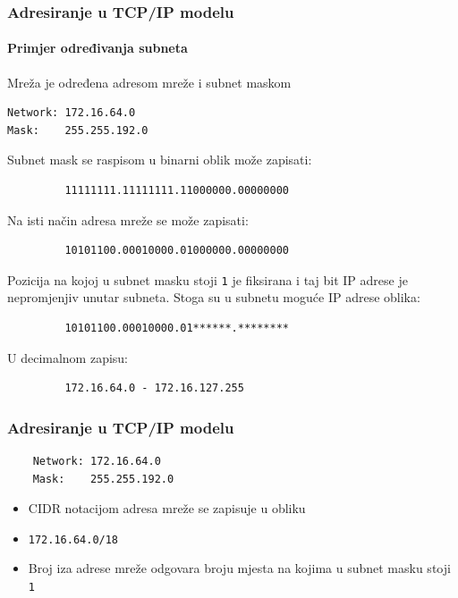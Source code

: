 \documentclass[t,table,usenames,dvipsnames]{beamer}
\begin{document}
\begin{frame}[fragile]
	\frametitle{Adresiranje u TCP/IP modelu}
	\framesubtitle{Primjer određivanja subneta}
	\footnotesize
	Mreža je određena adresom mreže i subnet maskom
	\begin{verbatim}
Network: 172.16.64.0
Mask:    255.255.192.0
	\end{verbatim}
	Subnet mask se raspisom u binarni oblik može zapisati:
	\begin{verbatim}
         11111111.11111111.11000000.00000000
	\end{verbatim}
	Na isti način adresa mreže se može zapisati:
	\begin{verbatim}
         10101100.00010000.01000000.00000000
	\end{verbatim}
	Pozicija na kojoj u subnet masku stoji \texttt{1} je fiksirana i taj bit IP adrese je nepromjenjiv unutar subneta. Stoga su u subnetu moguće IP adrese oblika:
	\begin{verbatim}
         10101100.00010000.01******.********
	\end{verbatim}
	U decimalnom zapisu:
	\begin{verbatim}
         172.16.64.0 - 172.16.127.255
	\end{verbatim}
\end{frame}

\begin{frame}[fragile]
	\frametitle{Adresiranje u TCP/IP modelu}
	\begin{verbatim}
	Network: 172.16.64.0
	Mask:    255.255.192.0
	\end{verbatim}
	\begin{itemize}
		\item CIDR notacijom adresa mreže se zapisuje u obliku
		\item[] \texttt{172.16.64.0/18}
	\end{itemize}
	\begin{itemize}
		\item Broj iza adrese mreže odgovara broju mjesta na kojima u subnet masku stoji \texttt{1}
	\end{itemize}
\end{frame}
\end{document}
